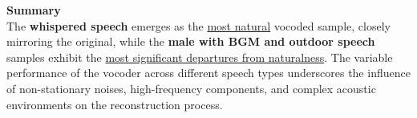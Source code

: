 \documentclass{../labbook}
\begin{document}
\begin{solution}
    \textbf{Summary}\\
    The \textbf{whispered speech} emerges as the \underline{most natural} vocoded sample, closely mirroring the original, while the \textbf{male with BGM and outdoor speech} samples exhibit the \underline{most significant departures from naturalness}. 
    The variable performance of the vocoder across different speech types underscores the influence of non-stationary noises, high-frequency components, and complex acoustic environments on the reconstruction process. 
\end{solution}
\end{document}
